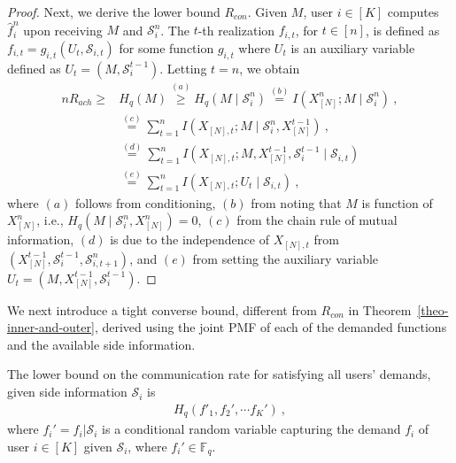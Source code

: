 \documentclass[conference, letterpaper]{IEEEtran} %
\begin{document}
\begin{proof}
Next, we derive the lower bound $R_{con}$. Given $M$, %
user $i\in [K]$ computes $\hat{f}_{i}^{n}$ upon receiving $M$ and $\mathcal{S}_{i}^{n}$. 
The $t$-th realization $f_{i,t}$, for $t\in [n]$, is defined as $f_{i,t}=g_{i,t}(U_{t}, \mathcal{S}_{i,t})$ for some function $g_{i,t}$ where $U_{t}$ is an  auxiliary variable defined as $U_{t}=(M, \mathcal{S}_{i}^{t-1})$. Letting $t=n$, we obtain 
\begin{align*}
    nR_{ach}\geq& H_q(M) \overset{(a)}{\geq}H_q(M\mid \mathcal{S}_{i}^{n}) \overset{(b)}{=}I(X_{[N]}^{n}; M\mid \mathcal{S}_{i}^{n})\ , \\
    &\overset{(c)}{=}\sum_{t=1}^{n}I(X_{[N],t};M\mid \mathcal{S}_{i}^{n}, X_{[N]}^{t-1}) \ ,\\
    &\overset{(d)}{=}\sum_{t=1}^{n}I(X_{[N],t};M,X_{[N]}^{t-1}, \mathcal{S}_{i}^{t-1}\mid \mathcal{S}_{i,t} ) \\ 
    &\overset{(e)}{=}\sum_{t=1}^{n}I(X_{[N],t};U_{t}\mid \mathcal{S}_{i,t})\ ,
\end{align*}
where $(a)$ follows from conditioning, $(b)$  from noting that $M$ is function of $X_{[N]}^{n}$, i.e., $H_q(M\mid \mathcal{S}_{i}^{n},X_{[N]}^{n})=0$, $(c)$ from the chain rule of mutual information, $(d)$ is due to the independence of $X_{[N],t}$ from $(X_{[N]}^{t-1}, \mathcal{S}_{i}^{t-1},\mathcal{S}_{i, t+1}^{n})$, and $(e)$ from setting the auxiliary variable $U_{t}=(M,X_{[N]}^{t-1}, \mathcal{S}_{i}^{t-1})$.
\end{proof}













We next introduce a tight converse bound, different from $R_{con}$ in Theorem~\ref{theo-inner-and-outer},
derived using the joint PMF of each of the demanded functions and the available side information.


\begin{prop}
\label{prop-lower-bound-mutual-info}    
The lower bound on the communication rate for satisfying all users' demands, given side information $\mathcal{S}_i$ is
\begin{align}
\label{eq-prop-lower-bound-mutual-info} 
H_q(f'_1, f_2', \cdots f_K') \ ,
\end{align}
where $f_i'= f_i|\mathcal{S}_i$ is a conditional random variable capturing the demand $f_i$ of user $i\in [K]$ given $\mathcal{S}_i$, where $f_i' \in \mathbb{F}_q$. 
\end{prop}
\end{document}
